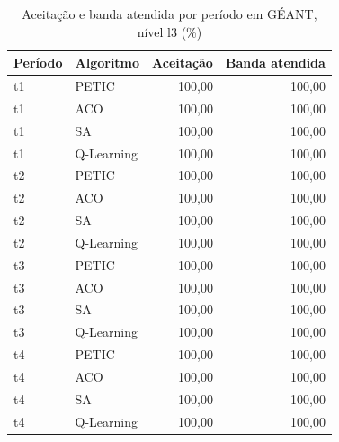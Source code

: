 \begin{table}[htb]
    \centering
    \scriptsize
    \caption{Aceitação e banda atendida por período em GÉANT, nível l3 (\%)}
    \label{tab:periodos-geant-l3}
    \begin{tabular}{llrr}
        \hline
        Período & Algoritmo & Aceitação & Banda atendida \\
        \hline
        t1 & PETIC & 100,00 & 100,00 \\
        t1 & ACO & 100,00 & 100,00 \\
        t1 & SA & 100,00 & 100,00 \\
        t1 & Q-Learning & 100,00 & 100,00 \\
        t2 & PETIC & 100,00 & 100,00 \\
        t2 & ACO & 100,00 & 100,00 \\
        t2 & SA & 100,00 & 100,00 \\
        t2 & Q-Learning & 100,00 & 100,00 \\
        t3 & PETIC & 100,00 & 100,00 \\
        t3 & ACO & 100,00 & 100,00 \\
        t3 & SA & 100,00 & 100,00 \\
        t3 & Q-Learning & 100,00 & 100,00 \\
        t4 & PETIC & 100,00 & 100,00 \\
        t4 & ACO & 100,00 & 100,00 \\
        t4 & SA & 100,00 & 100,00 \\
        t4 & Q-Learning & 100,00 & 100,00 \\
        \hline
    \end{tabular}
\end{table}

